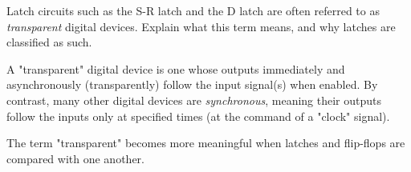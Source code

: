 

Latch circuits such as the S-R latch and the D latch are often referred to as {\it transparent} digital devices.  Explain what this term means, and why latches are classified as such.







A "transparent" digital device is one whose outputs immediately and asynchronously (transparently) follow the input signal(s) when enabled.  By contrast, many other digital devices are {\it synchronous}, meaning their outputs follow the inputs only at specified times (at the command of a "clock" signal).







The term "transparent" becomes more meaningful when latches and flip-flops are compared with one another.




